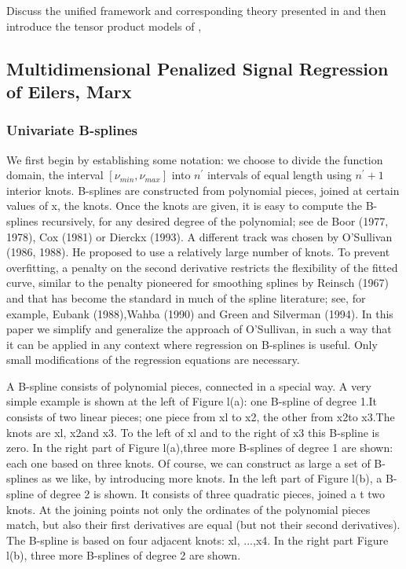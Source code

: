 \documentclass[12pt]{article}
\newcommand*\outlineskeleton{\color{green}}
\begin{document}
{\outlineskeleton Discuss the unified framework and corresponding theory presented in \cite{huang2001concave} and then introduce the tensor product models of \cite{eilers2003multivariate}, \cite{marx2005multidimensional}}


\subsection{{\outlineskeleton Multidimensional Penalized Signal Regression of Eilers, Marx}}


\subsubsection{{\outlineskeleton Univariate B-splines}}

We first begin by establishing some notation: we choose to divide the function domain, the interval $\left[\nu_{min},\nu_{max} \right]$ into $n^\prime$ intervals of equal length using $n^\prime + 1$ interior knots.
B-splines are constructed from polynomial pieces, joined at certain values of x, the knots. Once the knots are given, it is easy to compute the B-splines recursively, for any desired degree of the polynomial; see de Boor (1977, 1978), Cox (1981) or Dierckx (1993).  A different track was chosen by O'Sullivan (1986, 1988). He proposed to use a relatively large number of knots. To prevent overfitting, a penalty on the second derivative restricts the flexibility of the fitted curve, similar to the penalty pioneered for smoothing splines by Reinsch (1967) and that has become the standard in much of the spline literature; see, for example, Eubank (1988),Wahba (1990) and Green and Silverman (1994). In this paper we simplify and generalize the approach of O'Sullivan, in such a way that it can be applied in any context where regression on B-splines is useful. Only small modifications of the regression equations are necessary.

A B-spline consists of polynomial pieces, connected in a special way. A very simple example is shown at the left of Figure l(a): one B-spline of degree 1.It consists of two linear pieces; one piece from xl to x2, the other from x2to x3.The knots are xl, x2and x3. To the left of xl and to the right of x3 this B-spline is zero. In the right part of Figure l(a),three more B-splines of degree 1 are shown: each one based on three knots. Of course, we can construct as large a set of B-splines as we like, by introducing more knots.
In the left part of Figure l(b), a B-spline of degree 2 is shown. It consists of three quadratic pieces, joined a t two knots. At the joining points not only the ordinates of the polynomial pieces match, but also their first derivatives are equal (but not their second derivatives). The B-spline is based on four adjacent knots: xl, ...,x4. In the right part Figure l(b), three more B-splines of degree 2 are shown.
\end{document}
